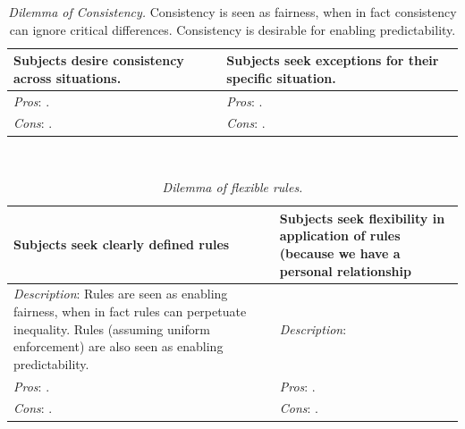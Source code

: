 \begin{center}
\begin{table}[H] %
\begin{tabular}{ | m{\dilemmatablewidth}| m{\dilemmatablewidth} | } 
  \hline
  \textbf{Subjects desire consistency across situations.} &
  \textbf{Subjects seek exceptions for their specific situation.} \\
  \hline
  \textit{Pros}: . & 
  \textit{Pros}: . \\
  \hline
  \textit{Cons}: . & 
  \textit{Cons}: . \\
  \hline
\end{tabular}
\caption{\textit{Dilemma of Consistency.}
Consistency is seen as fairness, when in fact consistency can ignore critical differences. Consistency is desirable for enabling predictability.
}
\label{table:dilemma-consistency}
\end{table}
\end{center}

\ \\

\begin{center}
\begin{table}[H] %
\begin{tabular}{ | m{\dilemmatablewidth}| m{\dilemmatablewidth} | } 
  \hline
  \textbf{Subjects seek clearly defined rules} &
  \textbf{Subjects seek flexibility in application of rules (because we have a personal relationship} \\
  \hline
  \textit{Description}: Rules are seen as enabling fairness, when in fact rules can perpetuate inequality. Rules (assuming uniform enforcement) are also seen as enabling predictability. & 
  \textit{Description}:  \\
  \hline
  \textit{Pros}: . & 
  \textit{Pros}: . \\
  \hline
  \textit{Cons}: . & 
  \textit{Cons}: . \\
  \hline
\end{tabular}
\caption{\textit{Dilemma of flexible rules.}
}
\label{table:dilemma-flexiblity}
\end{table}
\end{center}

\ \\

